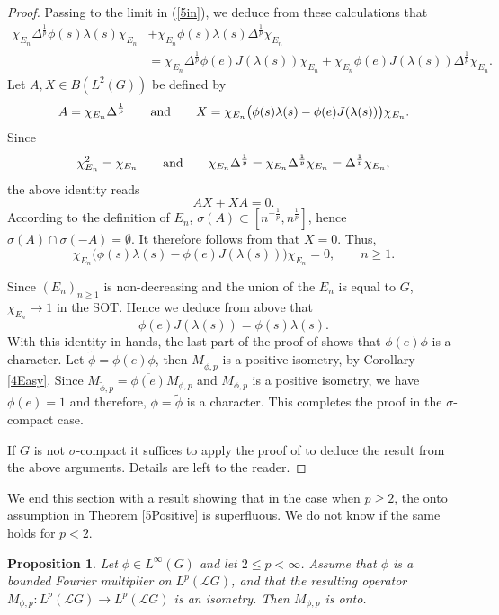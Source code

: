 \documentclass[12pt]{amsart}
\newtheorem{proposition}[theorem]{Proposition}
\theoremstyle{remark}
\theoremstyle{definition}
\numberwithin{equation}{section}
\begin{document}
\begin{proof}
Passing to the limit in (\ref{5in}), we deduce from these calculations that  
\begin{align*}
\chi_{E_n}\Delta^{\frac{1}{p}} \phi(s)\lambda(s)\chi_{E_n} &
+ \chi_{E_n}\phi(s)\lambda(s)\Delta^{\frac{1}{p}}\chi_{E_n} \\
& =\chi_{E_n}\Delta^{\frac{1}{p}}\phi(e)J(\lambda(s))\chi_{E_n}
+ \chi_{E_n}\phi(e)J(\lambda(s))
\Delta^{\frac{1}{p}}\chi_{E_n}.
\end{align*}
Let $A,X\in B(L^2(G))$ be defined by 
$$
A=\chi_{E_n}\Delta^{\frac{1}{p}}\qquad\hbox{and}\qquad 
X=\chi_{E_n}\bigl(\phi(s)\lambda(s) -\phi(e)J(\lambda(s))\bigr)\chi_{E_n}.
$$
Since 
$$
\chi_{E_n}^2=\chi_{E_n}
\qquad\hbox{and}\qquad
\chi_{E_n}\Delta^{\frac{1}{p}}=\chi_{E_n}\Delta^{\frac{1}{p}}\chi_{E_n}
=\Delta^{\frac{1}{p}}\chi_{E_n},
$$
the above identity reads
$$
AX+XA=0.
$$
According to the definition of $E_n$, $\sigma(A)\subset [n^{-\frac{1}{p}},n^\frac{1}{p}]$, 
hence
$\sigma(A)\cap \sigma(-A)=\emptyset$. It therefore follows from \cite[Theorem VII.2.1]{BR}
that $X=0$.
Thus,
$$
\chi_{E_n}\bigl(\phi(s)\lambda(s) -\phi(e)J(\lambda(s))\bigr)\chi_{E_n}=0,\qquad n\geq 1.
$$



Since $(E_n)_{n\geq 1}$ is non-decreasing and the union of the $E_n$ is equal to $G$, $\chi_{E_n}\to 1$ in the SOT.
Hence we deduce from above that
$$
\phi(e)J(\lambda(s)) = \phi(s)\lambda(s).
$$
With this identity in hands, the last part of the proof of \cite[Theorem 3.7]{AKLZ} 
shows that $\overline{\phi(e)}\phi$ is a character. Let $\widetilde{\phi} = \overline{\phi(e)}\phi$, then 
$M_{\widetilde{\phi},p}$ is a positive isometry, by Corollary \ref{4Easy}. Since 
$M_{\widetilde{\phi},p} =\overline{\phi(e)}M_{\phi,p}$ and 
$M_{\phi,p}$ is a positive isometry,  we have
$\phi(e)=1$ and therefore,
$\phi=\widetilde{\phi}$ is a character. This completes the proof in the $\sigma$-compact case.

If $G$ is not $\sigma$-compact it suffices to apply the proof of \cite[Corollary 3.13]{AKLZ}
to deduce the result from the above arguments. Details are left to the reader.
\end{proof}


We end this section with a result showing that in the case when
$p\geq 2$, the onto assumption in Theorem \ref{5Positive} is superfluous. We do not know 
if the same holds for $p<2$.



\begin{proposition}\label{5Onto}
Let $\phi\in L^\infty(G)$ and let $2\leq p<\infty$. Assume that $\phi$ is a bounded Fourier multiplier on $L^p({\mathcal L}G)$, and that the resulting operator $M_{\phi,p} \colon L^p({\mathcal L}G)\to L^p({\mathcal L}G)$ is an isometry.
Then $M_{\phi,p}$ is onto.
\end{proposition}
\end{document}

